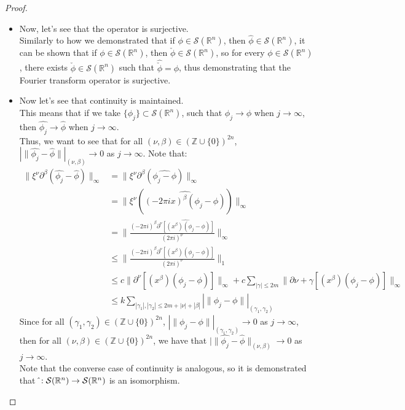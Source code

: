 \begin{proof}{}
\begin{itemize}
		\item Now, let's see that the operator is surjective.\\
		  Similarly to how we demonstrated that if $\phi\in\mathcal{S}(\mathbb{R}^n)$, then $\hat{\phi}\in\mathcal{S}(\mathbb{R}^n)$, it can be shown that if $\phi\in\mathcal{S}(\mathbb{R}^n)$, then $\check{\phi}\in\mathcal{S}(\mathbb{R}^n)$, so for every $\phi\in\mathcal{S}(\mathbb{R}^n)$, there exists $\check{\phi}\in\mathcal{S}(\mathbb{R}^n)$ such that $\hat{\check{\phi}}=\phi$, thus demonstrating that the Fourier transform operator is surjective.
		\item Now let's see that continuity is maintained.\\
		  This means that if we take $\{\phi_j\}\subset \mathcal{S}(\mathbb{R}^n)$, such that $\phi_j \rightarrow \phi$ when $j\rightarrow \infty$, then $\hat{\phi_j}\rightarrow \hat{\phi}$ when $j\rightarrow \infty$.\\
		  Thus, we want to see that for all $(\nu,\beta)\in(\mathbb{Z}\cup\{0\})^{2n}$, $|\|\hat{\phi_j}-\hat{\phi}\||_{(\nu,\beta)}\rightarrow 0$ as $j\rightarrow \infty$. Note that:
      \begin{align*}
			  \|\xi^{\nu}\partial^{\beta}(\hat{\phi_j}-\hat{\phi})\|_{\infty}&=\|\xi^{\nu}\partial^{\beta}(\hat{\phi_j-\phi})\|_{\infty}\\
			  &=\|\xi^{\nu}(\hat{(-2\pi ix)^{\beta}(\phi_j-\phi)})\|_{\infty}\\
			  &=\|\frac{(-2\pi i)^{\beta}\hat{\partial^{\nu}[(x^\beta)(\phi_j-\phi)]}}{(2\pi i)^{\nu}}\|_{\infty}\\
			  &\leq\|\frac{(-2\pi i)^{\beta}\partial^{\nu}[(x^\beta)(\phi_j-\phi)]}{(2\pi i)^{\nu}}\|_{1}\\
			  &\leq c\|\partial^{\nu}[(x^\beta)(\phi_j-\phi)]\|_{\infty}+c\sum_{|\gamma|\leq 2m}\|\partial{\nu+\gamma}[(x^\beta)(\phi_j-\phi)]\|_{\infty}\\
			  &\leq k \sum_{|\gamma_1|,|\gamma_2|\leq2m+|\nu|+|\beta|}|\|\phi_j-\phi\||_{(\gamma_1,\gamma_2)}
		  \end{align*}
		  Since for all $(\gamma_1,\gamma_2)\in(\mathbb{Z}\cup\{0\})^{2n}$, $|\|\phi_j-\phi\||_{(\gamma_1,\gamma_2)}\rightarrow 0$ as $j\rightarrow \infty$, then for all $(\nu,\beta)\in(\mathbb{Z}\cup\{0\})^{2n}$, we have that $|\|\hat{\phi_j}-\hat{\phi}\|_{(\nu,\beta)}\rightarrow 0$ as $j\rightarrow \infty$.\\
      Note that the converse case of continuity is analogous, so it is demonstrated that \phantom{  }$\hat{\empty}:\mathcal{S}(\mathbb{R}^n)\rightarrow\mathcal{S}(\mathbb{R}^n)$ is an isomorphism.
	\end{itemize}
\end{proof}
